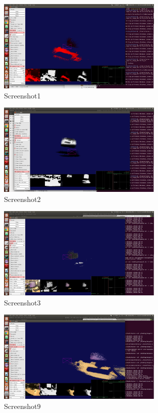 \documentclass[12pt,twoside]{article}
\begin{document}
\newpage






\begin{figure}[h]
    \centering
    \includegraphics[width=0.7\textwidth]{figures/Screenshot1}
    \caption{Screenshot1}
    \label{fig:Screenshot1}
\end{figure}

\begin{figure}[h]
    \centering
    \includegraphics[width=0.7\textwidth]{figures/Screenshot2}
    \caption{Screenshot2}
    \label{fig:Screenshot2}
\end{figure}

\begin{figure}[h]
    \centering
    \includegraphics[width=0.7\textwidth]{figures/Screenshot3}
    \caption{Screenshot3}
    \label{fig:Screenshot3}
\end{figure}

\begin{figure}[h]
    \centering
    \includegraphics[width=0.7\textwidth]{figures/Screenshot9}
    \caption{Screenshot9}
    \label{fig:Screenshot9}
\end{figure}
\end{document}
